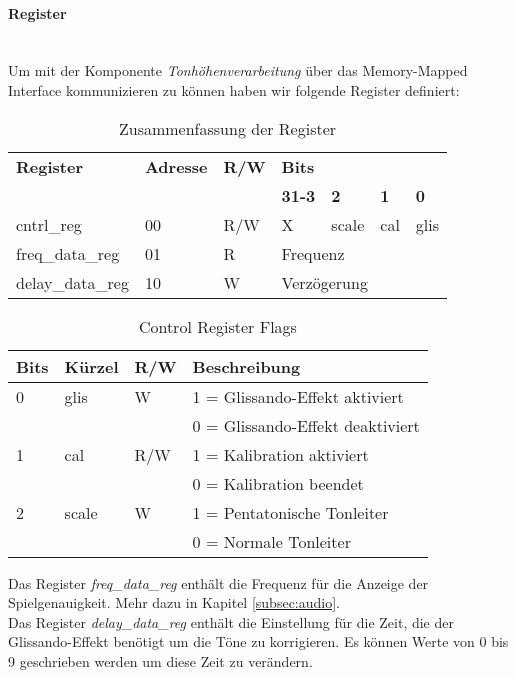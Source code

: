 \paragraph{Register}\mbox{}\\
Um mit der Komponente \textit{Tonhöhenverarbeitung} über das Memory-Mapped Interface kommunizieren zu können haben wir folgende Register definiert:

\begin{table}[H]
	\centering
	\caption{Zusammenfassung der Register}
	\label{tab:Registers_pitch}
	\begin{tabular}{l|l|l|l|l|l|l}
		\textbf{Register} & \textbf{Adresse} & \textbf{R/W} &	\multicolumn{4}{l}{\textbf{Bits}} \\\cline{4-7}
						  &					 &				& \textbf{31-3}  & \textbf{2} & \textbf{1} & \textbf{0}\\ 
		\hline \hline
		
		cntrl\_reg & 00 & R/W & X & scale & cal & glis \\ 
		\hline
		freq\_data\_reg & 01 & R & \multicolumn{4}{l}{Frequenz} \\
		\hline
		delay\_data\_reg & 10 & W & \multicolumn{4}{l}{Verzögerung} \\
	\end{tabular}
\end{table}

\begin{table}[H]
	\centering
	\caption{Control Register Flags}
	\label{tab:Register_pitch_cntrl}
	\begin{tabular}{l|l|l|l}
		\textbf{Bits} & \textbf{Kürzel} & \textbf{R/W} &	\textbf{Beschreibung}\\
		\hline \hline
		
		0 & glis & W &  1 = Glissando-Effekt aktiviert \\ 
		  &      &   &  0 = Glissando-Effekt deaktiviert \\ 
		\hline
		1 & cal & R/W &  1 = Kalibration aktiviert \\ 
		  &     &     &  0 = Kalibration beendet \\ 
		\hline
		2 & scale & W &  1 = Pentatonische Tonleiter \\ 
		 &     &       &  0 = Normale Tonleiter \\ 
		\hline

	\end{tabular}
\end{table}

Das Register \textit{freq\_data\_reg} enthält die Frequenz für die Anzeige der Spielgenauigkeit. Mehr dazu in Kapitel \ref{subsec:audio}. \\
Das Register \textit{delay\_data\_reg} enthält die Einstellung für die Zeit, die der Glissando-Effekt benötigt um die Töne zu korrigieren. Es können Werte von 0 bis 9 geschrieben werden um diese Zeit zu verändern.

